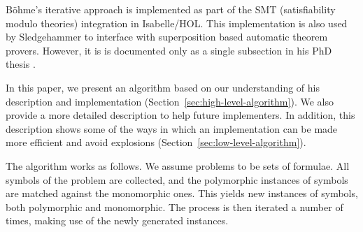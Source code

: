 \documentclass[]{ceurart}
\begin{document}


B\"ohme's iterative approach is implemented as part of the SMT (satisfiability modulo theories) integration \cite[Chapter 2]{sb-phd} in Isabelle/HOL. This implementation is also used by Sledgehammer \cite{judgement, hammer} to interface with superposition based automatic theorem provers. However, it is is documented only as a single subsection in his PhD thesis \cite[Section 2.2.1]{sb-phd}.

In this paper, we present an algorithm based on our understanding of his description and implementation (Section~\ref{sec:high-level-algorithm}). We also provide a more detailed description to help future implementers. In addition, this description shows some of the ways in which an implementation can be made more efficient and avoid explosions (Section~\ref{sec:low-level-algorithm}).

%


The algorithm works as follows. We assume problems to be sets of formulae. All symbols of the problem are collected, and the polymorphic instances of symbols are matched against the monomorphic ones. This yields new instances of symbols, both polymorphic and monomorphic. The process is then iterated
a number of times, making use of the newly generated instances.
\end{document}
